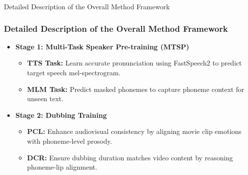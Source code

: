 \begin{frame}{Detailed Description of the Overall Method Framework}
    \frametitle{Detailed Description of the Overall Method Framework}
    \begin{itemize}
        \item \textbf{Stage 1: Multi-Task Speaker Pre-training (MTSP)}
        \begin{itemize}
            \item \textbf{TTS Task:} Learn accurate pronunciation using FastSpeech2\cite{ren2020fastspeech} to predict target speech mel-spectrogram.
            \item \textbf{MLM Task:} Predict masked phonemes to capture phoneme context for unseen text.
        \end{itemize}
        \item \textbf{Stage 2: Dubbing Training}
        \begin{itemize}
            \item \textbf{PCL:} Enhance audiovisual consistency by aligning movie clip emotions with phoneme-level prosody.
            \item \textbf{DCR:} Ensure dubbing duration matches video content by reasoning phoneme-lip alignment.
        \end{itemize}
    \end{itemize}
\end{frame}